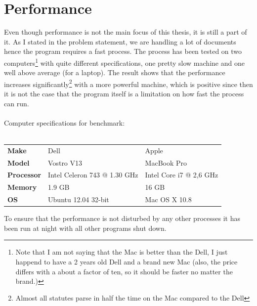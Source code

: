 \section{Performance}
Even though performance is not the main focus of this thesis, it is still a part of it. As I stated in the problem statement, we are handling a lot of documents hence the program requires a fast process. The process has been tested on two computers\footnote{Note that I am not saying that the Mac is better than the Dell, I just happend to have a 2 years old Dell and a brand new Mac (also, the price differs with a about a factor of ten, so it should be faster no matter the brand.)} with quite different specifications, one pretty slow machine and one well above average (for a laptop). The result shows that the performance increases significantly\footnote{Almost all statutes parse in half the time on the Mac compared to the Dell} with a more powerful machine, which is positive since then it is not the case that the program itself is a limitation on how fast the process can run.\\\\
Computer specifications for benchmark:\\\\ 
\begin{tabular}{l l l}
\textbf{Make} & Dell & Apple\\
\textbf{Model} & Vostro V13 & MacBook Pro\\
\textbf{Processor} & Intel Celeron 743 @ 1.30 GHz & Intel Core i7 @ 2,6 GHz \\
\textbf{Memory} & 1.9 GB & 16 GB\\
\textbf{OS} & Ubuntu 12.04 32-bit & Mac OS X 10.8\\
\end{tabular}
\linebreak
\newline
To ensure that the performance is not disturbed by any other processes it has been run at night with all other programs shut down.\\

